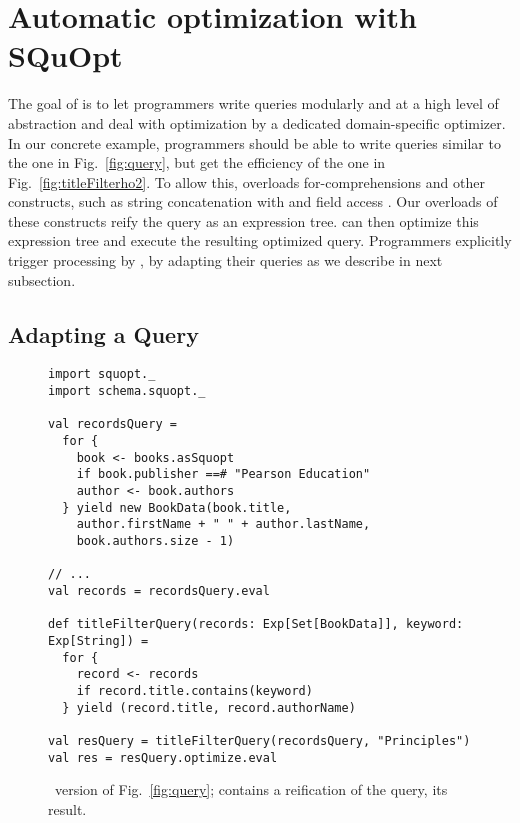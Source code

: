 \chapter{Automatic optimization with SQuOpt}

\label{ch:aosd13-solution}
\label{sec:solution}
The goal of {\LoS} is to let programmers write queries modularly and at a high level of abstraction and deal with optimization by a dedicated domain-specific optimizer. In our concrete example,
programmers should be able to write queries similar to the one in Fig.~\ref{fig:query}, but get the efficiency of the one in Fig.~\ref{fig:titleFilterho2}.
To allow this, {\LoS} overloads for-comprehensions and other constructs, such as string concatenation with \code{+} and field access . Our overloads of these constructs reify the query as an expression tree. {\LoS} can then optimize this expression tree and execute the resulting optimized query.
Programmers explicitly trigger processing by {\LoS}, by adapting their queries as we describe in next subsection.

\section{Adapting a Query}
\label{subsec:adaptingaquery}
\begin{figure}
\centering
\begin{lstlisting}
import squopt._
import schema.squopt._

val recordsQuery =
  for {
    book <- books.asSquopt
    if book.publisher ==# "Pearson Education"
    author <- book.authors
  } yield new BookData(book.title,
    author.firstName + " " + author.lastName,
    book.authors.size - 1)

// ...
val records = recordsQuery.eval

def titleFilterQuery(records: Exp[Set[BookData]], keyword: Exp[String]) =
  for {
    record <- records
    if record.title.contains(keyword)
  } yield (record.title, record.authorName)

val resQuery = titleFilterQuery(recordsQuery, "Principles")
val res = resQuery.optimize.eval
\end{lstlisting}
\caption{\LoS\ version of Fig.~\ref{fig:query};  contains a reification of the query,  its result.}
\label{fig:reifiedQuery}
\end{figure}

